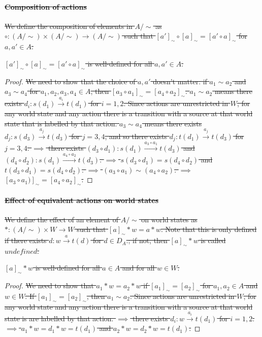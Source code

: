 \paragraph{\sout{Composition of actions}}
\sout{
We define the composition of elements in $A/\sim$ as $\circ: (A/\sim) \times (A/\sim) \to (A/\sim)$ such that $[a']_{\sim} \circ [a]_{\sim} = [a' \circ a]_{\sim}$ for $a,a' \in A$.
}

\begin{proposition}
    \sout{
    $[a']_{\sim} \circ [a]_{\sim} = [a' \circ a]_{\sim}$ is well-defined for all $a, a' \in A$.
    }
\end{proposition}
\begin{proof}
    \sout{
    We need to show that the choice of $a,a'$ doesn't matter: if $a_{1} \sim a_{2}$ and $a_{3} \sim a_{4}$ for $a_{1}, a_{2}, a_{3}, a_{4} \in A$, then $[a_{3} \circ a_{1}]_{\sim} = [a_{4} \circ a_{2}]_{\sim}$.
    $a_{1} \sim a_{2}$ means there exists $d_{i}: s(d_{1}) \xrightarrow{a_{i}} t(d_{1})$ for $i=1,2$.
    Since actions are unrestricted in $W$, for any world state and any action there is a transition with a source at that world state that is labelled by that action.
    $a_{3} \sim a_{4}$ means there exists $d_{j}: s(d_{3}) \xrightarrow{a_{j}} t(d_{3})$ for $j=3,4$, and so there exists $d_{j}: t(d_{1}) \xrightarrow{a_{j}} t(d_{3})$ for $j=3,4$.
    $\implies$ there exists $(d_{3} \circ d_{1}): s(d_{1}) \xrightarrow{a_{3} \circ a_{1}} t(d_{3})$ and $(d_{4} \circ d_{2}): s(d_{1}) \xrightarrow{a_{4} \circ a_{2}} t(d_{3})$.
    $\implies$ $s(d_{3} \circ d_{1}) = s(d_{4} \circ d_{2})$ and $t(d_{3} \circ d_{1}) = s(d_{4} \circ d_{2})$.
    $\implies$ $(a_{3} \circ a_{1}) \sim (a_{4} \circ a_{2})$.
    $\implies$ $[a_{3} \circ a_{1})]_{\sim} = [a_{4} \circ a_{2}]_{\sim}$.
    }
\end{proof}

\paragraph{\sout{Effect of equivalent actions on world states}}
\sout{
We define the effect of an element of  $A/\sim$ on world states as $*: (A/\sim) \times W \to W$ such that $[a]_{\sim} * w = a * w$.
Note that this is only defined if there exists $d: w \xrightarrow{a} t(d)$ for $d \in D_{A}$.; if not, then $[a]_{\sim} * w$ is called $\textit{undefined}$.
}

\begin{proposition}
    \sout{
    $[a]_{\sim} * w$ is well-defined for all $a \in A$ and for all $w \in W$.
    }
\end{proposition}
\begin{proof}
    \sout{
    We need to show that $a_{1} * w = a_{2} * w$ if $[a_{1}]_{\sim} = [a_{2}]_{\sim}$ for $a_{1},a_{2} \in A$ and $w \in W$.
    If $[a_{1}]_{\sim} = [a_{2}]_{\sim}$, then $a_{1} \sim a_{2}$.
    Since actions are unrestricted in $W$, for any world state and any action there is a transition with a source at that world state is are labelled by that action.
    $\implies$ there exists $d_{i}: w \xrightarrow{a_{i}} t(d_{1})$ for $i=1,2$.
    $\implies$ $a_{1} * w = d_{1} * w = t(d_{1})$ and $a_{2} * w = d_{2} * w = t(d_{1})$.
    }
\end{proof}

